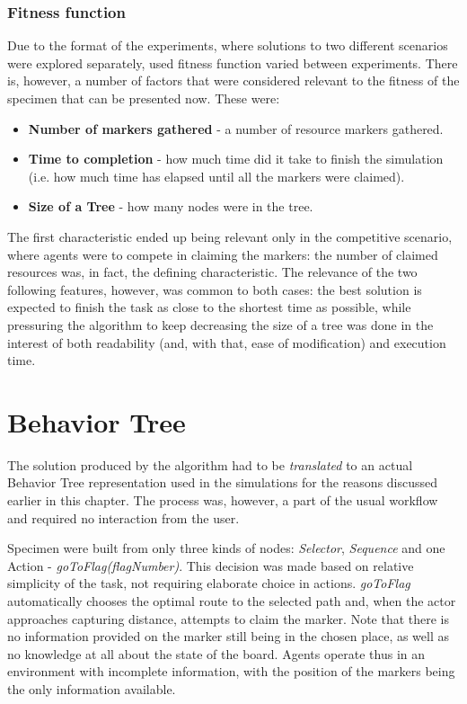 \subsubsection{Fitness function}
Due to the format of the experiments, where solutions to two different scenarios were explored separately, used fitness function varied between experiments. There is, however, a number of factors that were considered relevant to the fitness of the specimen that can be presented now. These were:
\begin{itemize}
    \item \textbf{Number of markers gathered} - a number of resource markers gathered.
    \item \textbf{Time to completion} - how much time did it take to finish the simulation (i.e. how much time has elapsed until all the markers were claimed).
    \item \textbf{Size of a Tree} - how many nodes were in the tree.
\end{itemize}
The first characteristic ended up being relevant only in the competitive scenario, where agents were to compete in claiming the markers: the number of claimed resources was, in fact, the defining characteristic. The relevance of the two following features, however, was common to both cases: the best solution is expected to finish the task as close to the shortest time as possible, while pressuring the algorithm to keep decreasing the size of a tree was done in the interest of both readability (and, with that, ease of modification) and execution time.
\section{Behavior Tree}
The solution produced by the algorithm had to be \textit{translated} to an actual Behavior Tree representation used in the simulations for the reasons discussed earlier in this chapter. The process was, however, a part of the usual workflow and required no interaction from the user.

Specimen were built from only three kinds of nodes: \textit{Selector}, \textit{Sequence} and one Action - \textit{goToFlag(flagNumber)}. This decision was made based on relative simplicity of the task, not requiring elaborate choice in actions. \textit{goToFlag} automatically chooses the optimal route to the selected path and, when the actor approaches capturing distance, attempts to claim the marker. Note that there is no information provided on the marker still being in the chosen place, as well as no knowledge at all about the state of the board. Agents operate thus in an environment with incomplete information, with the position of the markers being the only information available.

